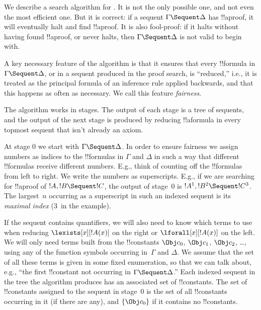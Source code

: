 \documentclass[../../../include/open-logic-section]{subfiles}
\begin{document}


We describe a search algorithm for . It is not the only
possible one, and not even the most efficient one. But it is correct:
if a sequent $\Gamma \Sequent \Delta$ has !!a{proof}, it will
eventually halt and find !!a{proof}. It is also fool-proof: if it
halts without having found !!a{proof}, or never halts, then $\Gamma
\Sequent \Delta$ is not valid to begin with.

A key necessary feature of the algorithm is that it ensures that every
!!{formula} in $\Gamma \Sequent \Delta$, or in a sequent produced in
the proof search, is ``reduced,'' i.e., it is treated as the principal
formula of an inference rule applied backwards, and that this happens
as often as necessary. We call this feature \emph{fairness}.

The algorithm works in stages. The output of each stage is a tree of
sequents, and the output of the next stage is produced by reducing
!!a{formula} in every topmost sequent that isn't already an axiom.

At stage $0$ we start with $\Gamma \Sequent \Delta$. In order to
ensure fairness we assign numbers as indices to the !!{formula}s in
$\Gamma$ and $\Delta$ in such a way that different !!{formula}s
receive different numbers. E.g., think of counting off the
!!{formula}s from left to right. We write the numbers as superscripts.
E.g., if we are searching for !!a{proof} of $!A, !B \Sequent !C$, the
output of stage~$0$ is $!A^1, !B^2 \Sequent !C^3$. The largest~$n$
occurring as a superscript in such an indexed sequent is its
\emph{maximal index} ($3$~in the example).

If the sequent contains quantifiers, we will also need to know which
terms to use when reducing $\lexists[x][!A(x)]$ on the right or
$\lforall[x][!A(x)]$ on the left. We will only need terms built from
the !!{constant}s $\Obj c_0$, $\Obj c_1$, $\Obj c_2$, \dots, using any
of the function symbols occurring in~$\Gamma$ and $\Delta$. We assume
that the set of all these terms is given in some fixed enumeration, so
that we can talk about, e.g., ``the first !!{constant} not occurring in
$\Gamma \Sequent \Delta$.'' Each indexed sequent in the tree the
algorithm produces has an associated set of !!{constant}s. The set of
!!{constant}s assigned to the sequent in stage~$0$ is the set of all
!!{constant}s occurring in it (if there are any), and $\{\Obj c_0\}$ if
it contains no !!{constant}s.
\end{document}
